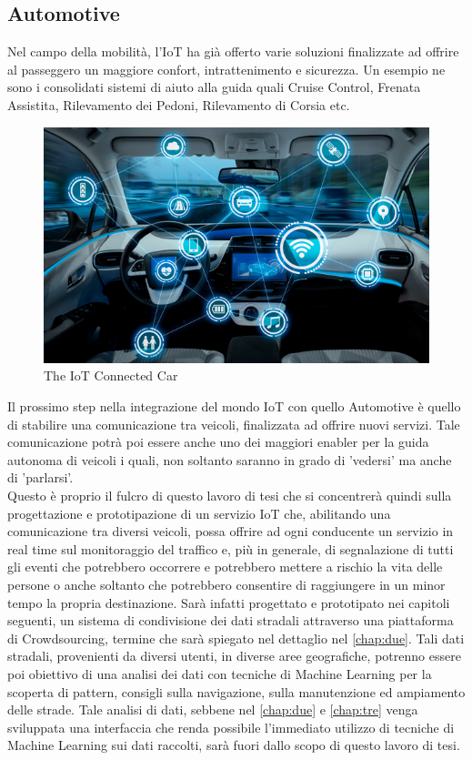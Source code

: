 \subsection{Automotive}
Nel campo della mobilità, l'IoT ha già offerto varie soluzioni finalizzate ad offrire al passeggero un maggiore confort, intrattenimento e sicurezza. Un esempio ne sono i consolidati sistemi di aiuto alla guida quali Cruise Control, Frenata Assistita, Rilevamento dei Pedoni, Rilevamento di Corsia etc. 
\begin{figure}
	\begin{center}
		\includegraphics[width=0.8\columnwidth]{images/application_automotive}
	\end{center}
	\caption{The IoT Connected Car}
	\label{fig:application_automotive}
\end{figure}
Il prossimo step nella integrazione del mondo IoT con quello Automotive è quello di stabilire una comunicazione tra veicoli, finalizzata ad offrire nuovi servizi. Tale comunicazione potrà poi essere anche uno dei maggiori enabler per la guida autonoma di veicoli i quali, non soltanto saranno in grado di 'vedersi' ma anche di 'parlarsi'.\\
Questo è proprio il fulcro di questo lavoro di tesi che si concentrerà quindi sulla progettazione e prototipazione di un servizio IoT che, abilitando una comunicazione tra diversi veicoli, possa offrire ad ogni conducente un servizio in real time sul monitoraggio del traffico e, più in generale, di segnalazione di tutti gli eventi che potrebbero occorrere e potrebbero mettere a rischio la vita delle persone o anche soltanto che potrebbero consentire di raggiungere in un minor tempo la propria destinazione. Sarà infatti progettato e prototipato nei capitoli seguenti, un sistema di condivisione dei dati stradali attraverso una piattaforma di Crowdsourcing, termine che sarà spiegato nel dettaglio nel \autoref{chap:due}. Tali dati stradali, provenienti da diversi utenti, in diverse aree geografiche, potrenno essere poi obiettivo di una analisi dei dati con tecniche di Machine Learning per la scoperta di pattern, consigli sulla navigazione, sulla manutenzione ed ampiamento delle strade. Tale analisi di dati, sebbene nel \autoref{chap:due} e \autoref{chap:tre} venga sviluppata una interfaccia che renda possibile l'immediato utilizzo di tecniche di Machine Learning sui dati raccolti, sarà fuori dallo scopo di questo lavoro di tesi.











